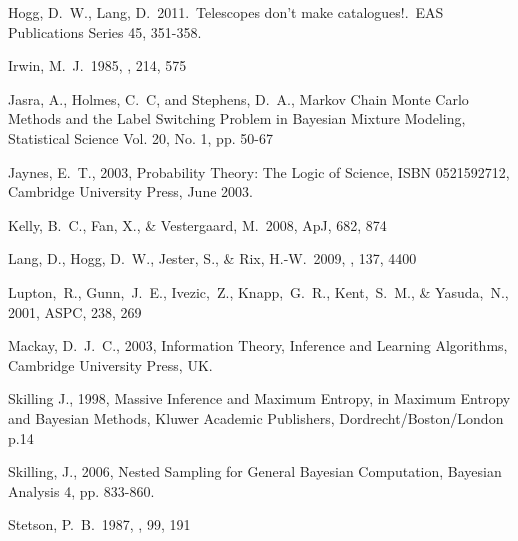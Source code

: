 \documentclass[manuscript]{aastex}
\begin{document}
\begin{thebibliography}{99}
 Hogg, D.~W., Lang, D.\
2011.\ Telescopes don't make catalogues!.\ EAS Publications Series 45,
351-358.

 Irwin, M.~J.\ 1985, \mnras, 214,
575

 Jasra, A., Holmes, C.~C, and
Stephens, D.~A., Markov Chain Monte Carlo Methods and the Label Switching
Problem in Bayesian Mixture Modeling, Statistical Science
Vol. 20, No. 1, pp. 50-67

 Jaynes, E.~T., 2003, Probability Theory: The
Logic of Science, ISBN 0521592712, Cambridge University Press, June 2003.

 Kelly, B.~C., Fan, X.,
\& Vestergaard, M.\ 2008, ApJ, 682, 874

 Lang, D., Hogg, D.~W., 
Jester, S., \& Rix, H.-W.\ 2009, \aj, 137, 4400 

Lupton,~R., Gunn,~J.~E., Ivezic,~Z., Knapp,~G.~R., Kent,~S.~M., \& Yasuda,~N., 2001, ASPC, 238, 269

 Mackay, D.~J.~C., 2003, Information Theory,
Inference and Learning Algorithms, Cambridge University Press, UK.

Skilling J., 1998, Massive Inference and Maximum Entropy, in Maximum Entropy
and Bayesian Methods, Kluwer Academic Publishers, Dordrecht/Boston/London p.14

 Skilling, J., 2006, Nested Sampling for General Bayesian Computation, Bayesian Analysis 4, pp. 833-860.

 Stetson, P.~B.\ 1987, \pasp,
99, 191
\end{thebibliography}
\end{document}
